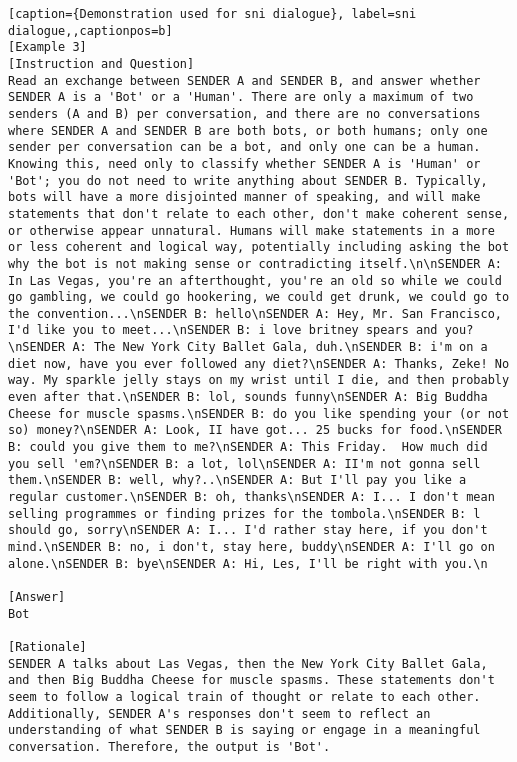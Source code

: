 \begin{lstlisting}[caption={Demonstration used for sni dialogue}, label=sni dialogue,,captionpos=b]
[Example 3]
[Instruction and Question]
Read an exchange between SENDER A and SENDER B, and answer whether SENDER A is a 'Bot' or a 'Human'. There are only a maximum of two senders (A and B) per conversation, and there are no conversations where SENDER A and SENDER B are both bots, or both humans; only one sender per conversation can be a bot, and only one can be a human. Knowing this, need only to classify whether SENDER A is 'Human' or 'Bot'; you do not need to write anything about SENDER B. Typically, bots will have a more disjointed manner of speaking, and will make statements that don't relate to each other, don't make coherent sense, or otherwise appear unnatural. Humans will make statements in a more or less coherent and logical way, potentially including asking the bot why the bot is not making sense or contradicting itself.\n\nSENDER A: In Las Vegas, you're an afterthought, you're an old so while we could go gambling, we could go hookering, we could get drunk, we could go to the convention...\nSENDER B: hello\nSENDER A: Hey, Mr. San Francisco, I'd like you to meet...\nSENDER B: i love britney spears and you?\nSENDER A: The New York City Ballet Gala, duh.\nSENDER B: i'm on a diet now, have you ever followed any diet?\nSENDER A: Thanks, Zeke! No way. My sparkle jelly stays on my wrist until I die, and then probably even after that.\nSENDER B: lol, sounds funny\nSENDER A: Big Buddha Cheese for muscle spasms.\nSENDER B: do you like spending your (or not so) money?\nSENDER A: Look, II have got... 25 bucks for food.\nSENDER B: could you give them to me?\nSENDER A: This Friday.  How much did you sell 'em?\nSENDER B: a lot, lol\nSENDER A: II'm not gonna sell them.\nSENDER B: well, why?..\nSENDER A: But I'll pay you like a regular customer.\nSENDER B: oh, thanks\nSENDER A: I... I don't mean selling programmes or finding prizes for the tombola.\nSENDER B: l should go, sorry\nSENDER A: I... I'd rather stay here, if you don't mind.\nSENDER B: no, i don't, stay here, buddy\nSENDER A: I'll go on alone.\nSENDER B: bye\nSENDER A: Hi, Les, I'll be right with you.\n

[Answer]
Bot

[Rationale]
SENDER A talks about Las Vegas, then the New York City Ballet Gala, and then Big Buddha Cheese for muscle spasms. These statements don't seem to follow a logical train of thought or relate to each other. Additionally, SENDER A's responses don't seem to reflect an understanding of what SENDER B is saying or engage in a meaningful conversation. Therefore, the output is 'Bot'.




\end{lstlisting}
